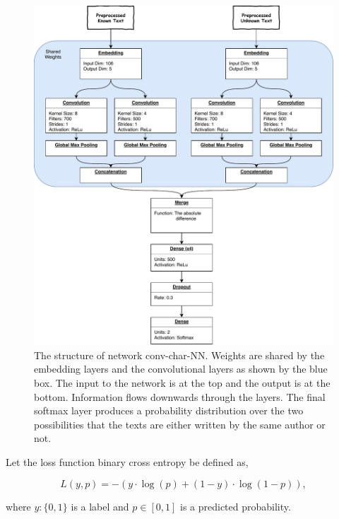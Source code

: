 \begin{figure}
    \centering
    \includegraphics[width=\textwidth]{./pictures/experiments/conv_char_nn/model}
    \caption{The structure of network \gls{conv-char-NN}. Weights are
        shared by the embedding layers and the convolutional layers as shown by
        the blue box. The input to the network is at the top and the output is
        at the bottom. Information flows downwards through the layers. The final
        softmax layer produces a probability distribution over the two
        possibilities that the texts are either written by the same author or
        not.}
    \label{fig:conv-char-NN}
\end{figure}

\begin{lemma}

    Let the loss function binary cross entropy be defined as,

    \begin{equation}\label{eq:binary_ce}
        L(y, p) = -(y \cdot \log(p) + (1- y)\cdot\log(1 - p)),
    \end{equation}

    where $y : \{0,1\}$ is a label and $p \in [0,1]$ is a predicted probability.

\end{lemma}

